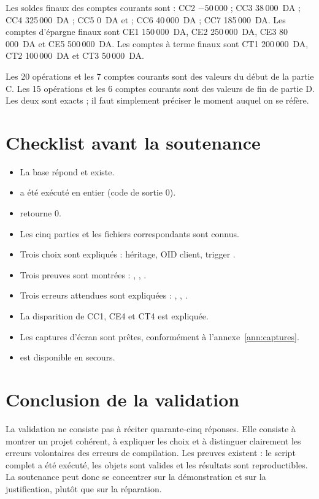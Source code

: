 Les soldes finaux des comptes courants sont : CC2 $-50\,000$ ; CC3
38\,000~DA ; CC4 325\,000~DA ; CC5 0~DA et  ; CC6 40\,000~DA ;
CC7 185\,000~DA. Les comptes d'épargne finaux sont CE1 150\,000~DA, CE2
250\,000~DA, CE3 80\,000~DA et CE5 500\,000~DA. Les comptes à terme finaux
sont CT1 200\,000~DA, CT2 100\,000~DA et CT3 50\,000~DA.

\begin{attentionbox}
Les 20 opérations et les 7 comptes courants sont des valeurs du début de la
partie C. Les 15 opérations et les 6 comptes courants sont des valeurs de fin
de partie D. Les deux sont exacts ; il faut simplement préciser le moment
auquel on se réfère.
\end{attentionbox}

\section{Checklist avant la soutenance}

\begin{itemize}
  \item La base répond et  existe.
  \item {} a été exécuté en entier (code de sortie
        0).
  \item {}
        retourne 0.
  \item Les cinq parties et les fichiers correspondants sont connus.
  \item Trois choix sont expliqués : héritage, OID client, trigger
        .
  \item Trois preuves sont montrées : , ,
        .
  \item Trois erreurs attendues sont expliquées : ,
        , .
  \item La disparition de CC1, CE4 et CT4 est expliquée.
  \item Les captures d'écran sont prêtes, conformément à
        l'annexe~\ref{ann:captures}.
  \item {} est disponible en secours.
\end{itemize}

\section{Conclusion de la validation}

La validation ne consiste pas à réciter quarante-cinq réponses. Elle consiste
à montrer un projet cohérent, à expliquer les choix et à distinguer clairement
les erreurs volontaires des erreurs de compilation. Les preuves existent : le
script complet a été exécuté, les objets sont valides et les résultats sont
reproductibles. La soutenance peut donc se concentrer sur la démonstration et
sur la justification, plutôt que sur la réparation.
